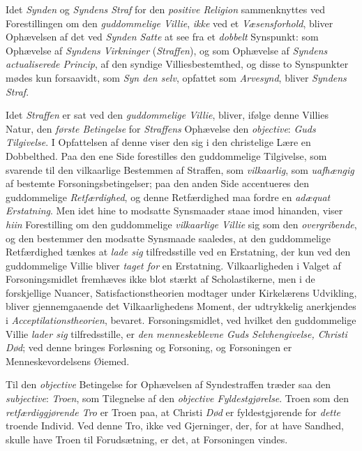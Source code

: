 Idet \emph{Synden} og \emph{Syndens Straf} for den \emph{positive Religion}
sammenknyttes ved Forestillingen om den \emph{guddommelige Villie},
\emph{ikke} ved et \emph{Væsensforhold}, bliver Ophævelsen af det ved
\emph{Synden Satte} at see fra et \emph{dobbelt} Synspunkt: som Ophævelse af
\emph{Syndens Virkninger} (\emph{Straffen}), og som Ophævelse af \emph{Syndens
actualiserede Princip}, af den syndige Villiesbestemthed, og disse to
Synspunkter mødes kun forsaavidt, som \emph{Syn\-%
den selv}, opfattet som \emph{Arvesynd}, bliver \emph{Syndens Straf}.

Idet \emph{Straffen} er sat ved den \emph{guddommelige Villie}, bliver, ifølge
denne Villies Natur, den \emph{første Betingelse} for \emph{Straffens}
Ophævelse den \emph{objective}: \emph{Guds Tilgivelse}. I Opfattelsen af denne
viser den sig i den christelige Lære en Dobbelthed. Paa den ene Side forestilles
den guddommelige Tilgivelse, som svarende til den vilkaarlige Bestemmen af
Straffen, som \emph{vilkaarlig}, som \emph{uafhængig} af bestemte
Forsoningsbetingelser; paa den anden Side accentueres den guddommelige
\emph{Retfærdighed}, og denne Retfærdighed maa fordre en \emph{adæquat
Erstatning}. Men idet hine to modsatte Synsmaader staae imod hinanden, viser
\emph{hiin} Forestilling om den guddommelige \emph{vilkaarlige Villie} sig som
den \emph{overgribende}, og den bestemmer den modsatte Synsmaade saaledes, at
den guddommelige Retfærdighed tænkes at \emph{lade sig} tilfredsstille ved en
Erstatning, der kun ved den guddommelige Villie bliver \emph{taget for} en
Erstatning. Vilkaarligheden i Valget af Forsoningsmidlet fremhæves ikke blot
stærkt af Scholastikerne, men i de forskjellige Nuancer, Satisfactionstheorien
modtager under Kirkelærens Udvikling, bliver gjennemgaaende det
Vilkaarlighedens Moment, der udtrykkelig anerkjendes i
\emph{Acceptilationstheorien}, bevaret. Forsoningsmidlet, ved hvilket den
guddommelige Villie \emph{lader sig} tilfredsstille, er \emph{den
menneskeblevne Guds Selvhengivelse, Christi Død}; ved denne bringes Forløsning
og Forsoning, og Forsoningen er Menneskevordelsens Øiemed.

Til den \emph{objective} Betingelse for Ophævelsen af Syndestraffen træder saa
den \emph{subjective}: \emph{Troen}, som Tilegnelse af den \emph{objective
Fyldestgjørelse}. Troen som den \emph{retfærdiggjørende Tro} er Troen paa, at
Christi \emph{Død} er fyldestgjørende for \emph{dette} troende Individ. Ved
denne Tro, ikke ved Gjerninger, der, for at have Sandhed, skulle have Troen til
Forudsætning, er det, at Forsoningen vindes.

